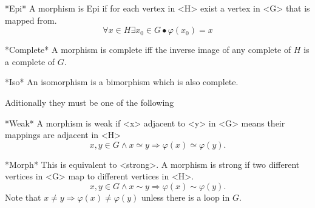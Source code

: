 \item{*Epi*}
A morphism is Epi if for each vertex in <H> exist a vertex in <G> that
is mapped from. $$\forall x \in H \exists x_0 \in G \bullet
\varphi(x_0) = x$$

\item{*Complete*}
A morphism is complete iff the inverse image of any complete of $H$ is
a complete of $G.$

\item{*Iso*}
An isomorphism is a bimorphism which is also complete.

\endlist

Aditionally they must be one of the following

\beginlist
\item{*Weak*}
A morphism is weak if <x> adjacent to <y> in <G> means their mappings
are adjacent in <H> $$x, y \in G \wedge x \simeq y \Rightarrow
\varphi(x) \simeq \varphi(y).$$

\item{*Morph*}
This is equivalent to <strong>. A morphism is strong if two different
vertices in <G> map to different vertices in <H>. $$x, y \in G \wedge
x \sim y \Rightarrow \varphi(x) \sim \varphi(y).$$ Note that $x \neq y
\Rightarrow \varphi(x) \neq \varphi(y)$ unless there is a loop in $G.$

\endlist

 


